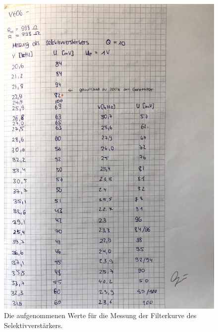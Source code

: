 \begin{figure}
    \centering
    \includegraphics[width=\textwidth]{content/datenselektiv.pdf}
    \caption{Die aufgenommenen Werte für die Messung der Filterkurve des Selektivverstärkers.}
    \label{fig:datenselektiv2}
\end{figure}
